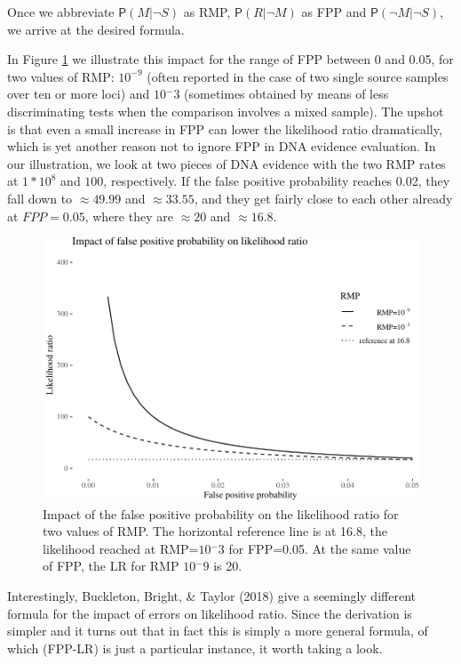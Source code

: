 \documentclass[10pt,dvipsnames,enabledeprecatedfontcommands]{scrartcl}
\newcommand{\n}{\neg}
\newcommand{\pr}[1]{\mathsf{P}(#1)}
\begin{document}
Once we abbreviate \(\pr{M\vert \n S}\) as RMP, \(\pr{R \vert \n M}\) as
FPP and \(\pr{\n M \vert \n S}\), we arrive at the desired formula.

In Figure \ref{fig:fpplr} we illustrate this impact for the range of FPP
between 0 and 0.05, for two values of RMP: \(10^{-9}\) (often reported
in the case of two single source samples over ten or more loci) and
\(10{^-3}\) (sometimes obtained by means of less discriminating tests
when the comparison involves a mixed sample). The upshot is that even a
small increase in FPP can lower the likelihood ratio dramatically, which
is yet another reason not to ignore FPP in DNA evidence evaluation. In
our illustration, we look at two pieces of DNA evidence with the two RMP
rates at \(1*10^8\) and \(100\), respectively. If the false positive
probability reaches 0.02, they fall down to \(\approx 49.99\) and
\(\approx 33.55\), and they get fairly close to each other already at
\(FPP=0.05\), where they are \(\approx 20\) and \(\approx 16.8\).

\begin{figure}

\begin{center}\includegraphics[width=1\linewidth]{lr-chapter3_files/figure-latex/fig-fpplr-1} \end{center}
\label{fig:fpplr}
\caption{Impact of the false positive probability on the likelihood ratio for two values of RMP. The horizontal reference line is at 16.8, the likelihood reached at RMP=$10{^-3}$ for FPP=0.05. At the same value of FPP, the LR for RMP $10{^-9}$ is 20.}
\end{figure}

Interestingly, Buckleton, Bright, \& Taylor (2018) give a seemingly
different formula for the impact of errors on likelihood ratio. Since
the derivation is simpler and it turns out that in fact this is simply a
more general formula, of which (FPP-LR) is just a particular instance,
it worth taking a look.
\end{document}
